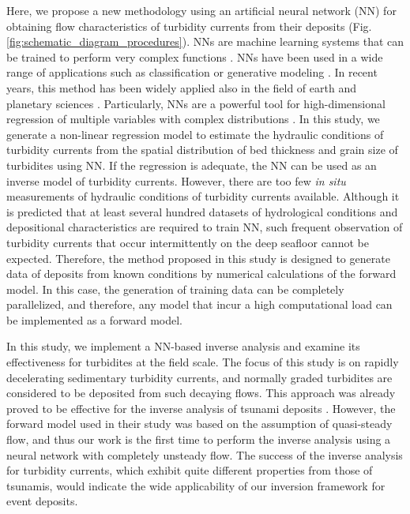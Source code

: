 Here, we propose a new methodology using an artificial neural network (NN) for obtaining flow characteristics of turbidity currents from their deposits (Fig. \ref{fig:schematic_diagram_procedures}). NNs are machine learning systems that can be trained to perform very complex functions \citep{HechtNielsen1987}. NNs have been used in a wide range of applications such as classification \citep{Krizhevsky2012} or generative modeling \citep{Sun2018}. In recent years, this method has been widely applied also in the field of earth and planetary sciences \citep{Laloy2018}. Particularly, NNs are a powerful tool for high-dimensional regression of multiple variables with complex distributions \citep{LeCun2015}. In this study, we generate a non-linear regression model to estimate the hydraulic conditions of turbidity currents from the spatial distribution of bed thickness and grain size of turbidites using NN. If the regression is adequate, the NN can be used as an inverse model of turbidity currents. However, there are too few \textit{in situ} measurements of hydraulic conditions of turbidity currents available. Although it is predicted that at least several hundred datasets of hydrological conditions and depositional characteristics are required to train NN, such frequent observation of turbidity currents that occur intermittently on the deep seafloor cannot be expected. Therefore, the method proposed in this study is designed to generate data of deposits from known conditions by numerical calculations of the forward model. In this case, the generation of training data can be completely parallelized, and therefore, any model that incur a high computational load can be implemented as a forward model. 

In this study, we implement a NN-based inverse analysis and examine its effectiveness for turbidites at the field scale. The focus of this study is on rapidly decelerating sedimentary turbidity currents, and normally graded turbidites are considered to be deposited from such decaying flows. This approach was already proved to be effective for the inverse analysis of tsunami deposits \citep{Mitra2020a}. However, the forward model used in their study was based on the assumption of quasi-steady flow, and thus our work is the first time to perform the inverse analysis using a neural network with completely unsteady flow. The success of the inverse analysis for turbidity currents, which exhibit quite different properties from those of tsunamis, would indicate the wide applicability of our inversion framework for event deposits.

